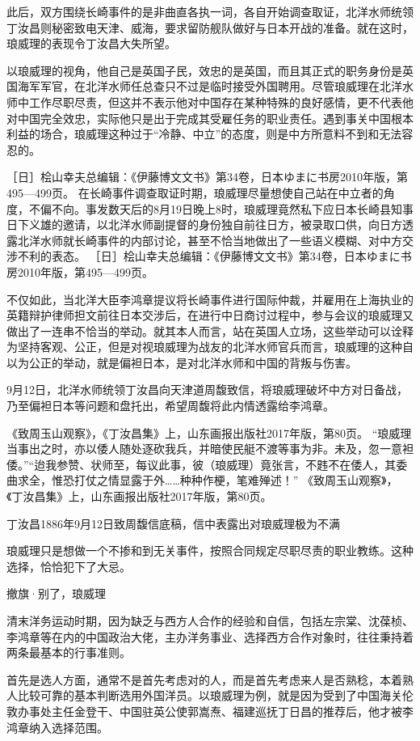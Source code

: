 \documentclass[12pt,UTF8]{ctexbook}
\begin{document}
此后，双方围绕长崎事件的是非曲直各执一词，各自开始调查取证，北洋水师统领丁汝昌则秘密致电天津、威海，要求留防舰队做好与日本开战的准备。就在这时，琅威理的表现令丁汝昌大失所望。

以琅威理的视角，他自己是英国子民，效忠的是英国，而且其正式的职务身份是英国海军军官，在北洋水师任总查只不过是临时接受外国聘用。尽管琅威理在北洋水师中工作尽职尽责，但这并不表示他对中国存在某种特殊的良好感情，更不代表他对中国完全效忠，实际他只是出于完成其受雇任务的职业责任。遇到事关中国根本利益的场合，琅威理这种过于“冷静、中立”的态度，则是中方所意料不到和无法容忍的。

［日］桧山幸夫总编辑：《伊藤博文文书》第34卷，日本ゆまに书房2010年版，第495—499页。
在长崎事件调查取证时期，琅威理尽量想使自己站在中立者的角度，不偏不向。事发数天后的8月19日晚上8时，琅威理竟然私下应日本长崎县知事日下义雄的邀请，以北洋水师副提督的身份独自前往日方，被录取口供，向日方透露北洋水师就长崎事件的内部讨论，甚至不恰当地做出了一些语义模糊、对中方交涉不利的表态。 ［日］桧山幸夫总编辑：《伊藤博文文书》第34卷，日本ゆまに书房2010年版，第495—499页。

不仅如此，当北洋大臣李鸿章提议将长崎事件进行国际仲裁，并雇用在上海执业的英籍辩护律师担文前往日本交涉后，在进行中日商讨过程中，参与会议的琅威理又做出了一连串不恰当的举动。就其本人而言，站在英国人立场，这些举动可以诠释为坚持客观、公正，但是对视琅威理为战友的北洋水师官兵而言，琅威理的这种自以为公正的举动，就是偏袒日本，是对北洋水师和中国的背叛与伤害。

9月12日，北洋水师统领丁汝昌向天津道周馥致信，将琅威理破坏中方对日备战，乃至偏袒日本等问题和盘托出，希望周馥将此内情透露给李鸿章。

《致周玉山观察》，《丁汝昌集》上，山东画报出版社2017年版，第80页。
“琅威理当事出之时，亦以倭人随处逐砍我兵，并暗使民艇不渡等事为非。未及，忽一意袒倭。”“迨我参赞、状师至，每议此事，彼（琅威理）竟张言，不韪不在倭人，其委曲求全，惟恐打仗之情显露于外……种种作梗，笔难殚述！” 《致周玉山观察》，《丁汝昌集》上，山东画报出版社2017年版，第80页。


丁汝昌1886年9月12日致周馥信底稿，信中表露出对琅威理极为不满

琅威理只是想做一个不掺和到无关事件，按照合同规定尽职尽责的职业教练。这种选择，恰恰犯下了大忌。

撤旗·别了，琅威理

清末洋务运动时期，因为缺乏与西方人合作的经验和自信，包括左宗棠、沈葆桢、李鸿章等在内的中国政治大佬，主办洋务事业、选择西方合作对象时，往往秉持着两条最基本的行事准则。

首先是选人方面，通常不是首先考虑对的人，而是首先考虑来人是否熟稔，本着熟人比较可靠的基本判断选用外国洋员。以琅威理为例，就是因为受到了中国海关伦敦办事处主任金登干、中国驻英公使郭嵩焘、福建巡抚丁日昌的推荐后，他才被李鸿章纳入选择范围。
\end{document}
